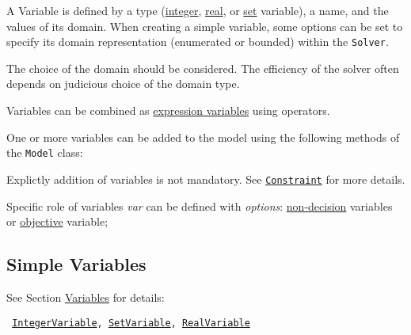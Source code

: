 A Variable is defined by a type (\hyperlink{integervariable}{integer}, \hyperlink{realvariable}{real}, or \hyperlink{setvariable}{set} variable), a name, and the values of its domain. When creating a simple variable, some options can be set to specify its domain representation (\eg enumerated or bounded) within the {\tt Solver}.
\begin{note}
The choice of the domain should be considered. The efficiency of the solver often depends on judicious choice of the domain type.
\end{note}
Variables can be combined as \hyperlink{model:expressionvariables}{expression variables} using operators.

One or more variables can be added to the model using the following methods of the \texttt{Model} class:


\begin{note}
Explictly addition of variables is not mandatory. See \hyperlink{model:constraints}{\tt Constraint} for more details.
\end{note}

Specific role of variables \emph{var} can be defined with \emph{options}:  \hyperlink{model:decisionvariables}{non-decision} variables or  \hyperlink{model:objectivevariable}{objective} variable;



\subsection{Simple Variables}\label{model:simplevariables}\hypertarget{model:simplevariables}{}
See Section \hyperlink{ch:vars}{Variables} for details:

\begin{notedef}\tt
\hyperlink{integervariable}{IntegerVariable}, \hyperlink{setvariable}{SetVariable}, \hyperlink{realvariable}{RealVariable}
\end{notedef}


